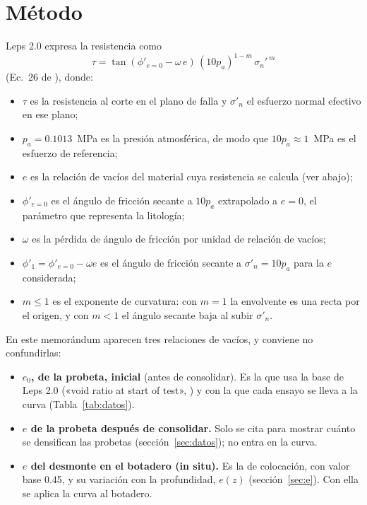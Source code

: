 \documentclass[11pt,letterpaper]{article}
\begin{document}
\section{Método}\label{sec:metodo}
Leps 2.0 expresa la resistencia como
\begin{equation}
\tau = \tan\!\left(\phi'_{e=0} - \omega\, e\right)\,(10p_a)^{1-m}\,\sigma_n'^{\,m}
\end{equation}
(Ec.~26 de \citealp{cylwik}), donde:
\begin{itemize}
\item $\tau$ es la resistencia al corte en el plano de falla y $\sigma'_n$ el esfuerzo normal efectivo en ese plano;
\item $p_a = 0.1013$~MPa es la presión atmosférica, de modo que $10p_a \approx 1$~MPa es el esfuerzo de referencia;
\item $e$ es la relación de vacíos del material cuya resistencia se calcula (ver abajo);
\item $\phi'_{e=0}$ es el ángulo de fricción secante a $10p_a$ extrapolado a $e = 0$, el parámetro que representa la litología;
\item $\omega$ es la pérdida de ángulo de fricción por unidad de relación de vacíos;
\item $\phi'_1 = \phi'_{e=0} - \omega e$ es el ángulo de fricción secante a $\sigma'_n = 10p_a$ para la $e$ considerada;
\item $m \le 1$ es el exponente de curvatura: con $m = 1$ la envolvente es una recta por el origen, y con $m < 1$ el ángulo secante baja al subir $\sigma'_n$.
\end{itemize}
En este memorándum aparecen tres relaciones de vacíos, y conviene no confundirlas:
\begin{itemize}
\item \textbf{$e_0$, de la probeta, inicial} (antes de consolidar). Es la que usa la base de Leps 2.0 («void ratio at start of test», \citealp[Tabla~2]{cylwik}) y con la que cada ensayo se lleva a la curva (Tabla~\ref{tab:datos}).
\item \textbf{$e$ de la probeta después de consolidar.} Solo se cita para mostrar cuánto se densifican las probetas (sección~\ref{sec:datos}); no entra en la curva.
\item \textbf{$e$ del desmonte en el botadero (in situ).} Es la de colocación, con valor base 0.45, y su variación con la profundidad, $e(z)$ (sección~\ref{sec:e}). Con ella se aplica la curva al botadero.
\end{itemize}
\end{document}
